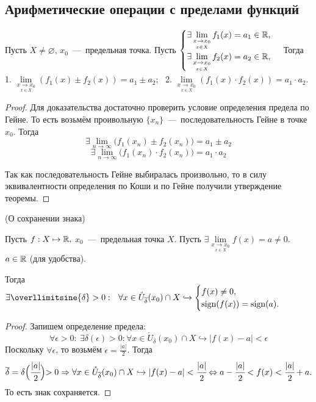 \subsection{Арифметические операции с пределами функций}

\begin{theorem}
    Пусть $X \neq \varnothing$, $x_{0}$~---~предельная точка. Пусть $\begin{cases}
        \exists \lim\limits_{\underset{x \in X}{x\to x_0}} f_{1} (x) = a_{1} \in \mathbb{R}, \\
        \exists \lim\limits_{\underset{x \in X}{x\to x_0}} f_{2} (x) = a_{2} \in \mathbb{R}, \\
    \end{cases}$ Тогда
        1. $\lim\limits_{\underset{x \in X}{x\to x_0}} \left(f_{1} (x) \pm  f_{2} (x)\right) = a_{1} \pm a_{2}$; \  
        2. $\lim\limits_{\underset{x \in X}{x\to x_0}} \left(f_{1} (x) \cdot f_{2} (x) \right) = a_{1} \cdot a_{2}$.
\end{theorem}
\begin{proof}
    Для доказательства достаточно проверить условие определения предела по Гейне. То есть возьмём проивольную $\{x_{n}\}$~---~последовательность Гейне в точке $x_{0}$. Тогда
    $$
    \exists \lim\limits_{n\to \infty} \big(f_{1}(x_{n}) \pm f_{2}(x_{n})\big) = a_{1} \pm a_{2}
    $$
    $$
    \exists \lim\limits_{n\to \infty} \big(f_{1}(x_{n}) \cdot f_{2}(x_{n})\big) = a_{1} \cdot a_{2}
    $$

    Так как последовательность Гейне выбиралась произвольно, то в силу эквивалентности определения по Коши и по Гейне получили утверждение теоремы.
\end{proof}

\begin{lemma}
    \hypertarget{lemm4.4}{(О сохранении знака)} Пусть $f: X \mapsto \mathbb{R},$ $x_{0}$~---~предельная точка $X$. Пусть $\exists \lim\limits_{\underset{x \in X}{x\to x_0}} f(x) = a \neq 0$. $a \in \mathbb{R}$ (для удобства).

    Тогда $ \exists \overllimitsine{\delta} > 0: \ \ \forall x\in  \mathring{U}_{\overline{\delta}}(x_{0}) \cap X \hookrightarrow 
    \begin{cases}
        f(x) \neq 0, \\
        \text{sign}( f(x)) = \text{sign} (a).
        \end{cases}$
\end{lemma}
\begin{proof}
    Запишем определение предела:
    $$\forall\epsilon > 0: \ \exists\delta(\epsilon) > 0: \forall x \in \mathring{U}_{\overline{\delta}}(x_{0}) \cap X \hookrightarrow |f(x) - a| < \epsilon
    $$
    Поскольку $\forall \epsilon$, то возьмём $\epsilon = \frac{|a|}{2}$. Тогда
    $$
    \overline{\delta} = \delta\Bigr(\cfrac{|a|}{2}\Bigl) > 0 \Rightarrow \forall x \in \mathring{U}_{\overline{\delta}}(x_{0}) \cap X \hookrightarrow |f(x) - a| < \cfrac{|a|}{2} \Leftrightarrow a - \cfrac{|a|}{2} < f(x) < \cfrac{|a|}{2} + a.
    $$
    То есть знак сохраняется.
\end{proof}


